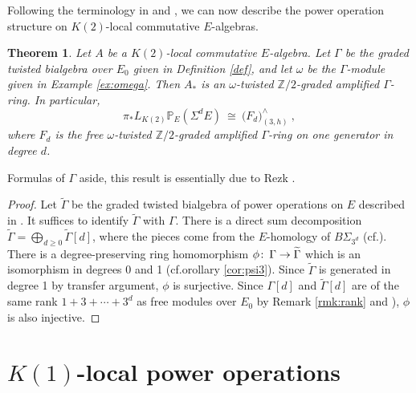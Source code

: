 \documentclass{gtpart}
\newtheorem{thm}{Theorem}
\theoremstyle{definition}
\theoremstyle{remark}
\def\co{\colon\thinspace}
\newcommand{\mb}[1]{\mathbb{#1}}
\newcommand{\cff}[2]{cf.\thinspace{\cite[#1]{#2}}}
\newcommand{\BP}{{\mb P}}
\newcommand{\BZ}{{\mb Z}}
\newcommand{\TG}{\widetilde{\G}}
\newcommand{\G}{\Gamma}
\begin{document}
Following the terminology in \cite[Section 2]{cong} and \cite[2.5 and 2.6]{h2p2}, we can now describe the power operation structure on $K(2)$-local commutative $E$-algebras.  
\begin{thm}
\label{thm}
 Let $A$ be a $K(2)$-local commutative $E$-algebra.  
 Let $\G$ be the graded twisted bialgebra over $E_0$ given in Definition \ref{def}, and let $\omega$ be the $\G$-module given in Example \ref{ex:omega}.  
 Then $A_*$ is an {\em $\omega$-twisted $\BZ/2$-graded amplified $\G$-ring}.  In particular, 
 \[
  \pi_* L_{K(2)} \BP_E (\Sigma^d E) ~ \cong ~ \big( F_d \big)_{(3,h)}^\wedge ~ , 
 \]
 where $F_d$ is the free $\omega$-twisted $\BZ/2$-graded amplified $\G$-ring on one generator in degree $d$.  
\end{thm}
Formulas of $\G$ aside, this result is essentially due to Rezk \cite{cong, h2p2}.  
\begin{proof}
 Let $\TG$ be the graded twisted bialgebra of power operations on $E$ described in \cite[Section 6]{cong}.  
 It suffices to identify $\TG$ with $\G$.  
 There is a direct sum decomposition $\TG = \bigoplus_{d \geq 0} \TG[d]$, where the pieces come from the $E$-homology of $B\Sigma_{3^d}$ (\cff{6.2}{cong}).  
 There is a degree-preserving ring homomorphism $\phi \co \G \to \TG$ which is an isomorphism in degrees 0 and 1 (cf.orollary \ref{cor:psi3}).  
 Since $\TG$ is generated in degree 1 by transfer argument, $\phi$ is surjective.  
 Since $\G[d]$ and $\TG[d]$ are of the same rank $1 + 3 + \cdots + 3^d$ as free modules over $E_0$ by Remark \ref{rmk:rank} and \cite[Theorem 1.1]{Str98}), 
 $\phi$ is also injective.  
\end{proof}


\section{$K(1)$-local power operations}
\label{sec:K(1)}
\end{document}
